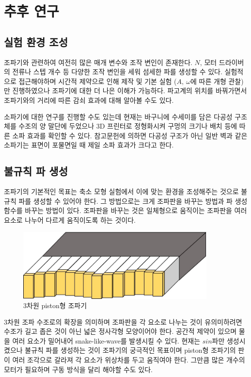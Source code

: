 \section{추후 연구}

\subsection{실험 환경 조성}
조파기와 관련하여 여전히 많은 매개 변수와 조작 변인이 존재한다. $N$, 모터 드라이버의 전류나 스텝 개수 등 다양한 조작 변인을 세워 섬세한 파를 생성할 수 있다. 실험적으로 접근해야하며 시간적 제약으로 인해 제작 및 기본 실험 ($A,~\omega$에 따른 개형 관찰)만 진행하였으나 조파기에 대한 더 나은 이해가 가능하다. 파고계의 위치를 바꿔가면서 조파기와의 거리에 따른 감쇠 효과에 대해 알아볼 수도 있다.

소파기에 대한 연구를 진행할 수도 있는데 현재는 바구니에 수세미를 담은 다공성 구조체를 수조의 양 말단에 두었으나 3D 프린터로 정형화시켜 구멍의 크기나 배치 등에 따른 소파 효과를 확인할 수 있다. 참고문헌에 의하면 다공성 구조가 아닌 일반 벽과 같은 소파기는 표면이 포물면일 때 제일 소파 효과가 크다고 한다.

\subsection{불규칙 파 생성}
조파기의 기본적인 목표는 축소 모형 실험에서 이에 맞는 환경을 조성해주는 것으로 불규칙 파를 생성할 수 있어야 한다. 그 방법으로는 크게 조파판을 바꾸는 방법과 파 생성함수를 바꾸는 방법이 있다. 조파판을 바꾸는 것은 일체형으로 움직이는 조파판을 여러 요소로 나누어 다르게 움직이도록 하는 것이다.

\begin{figure}[htbp]
    \centering
    \includegraphics[width=10cm]{images/Wave_Maker(Snake).jpg}
    \caption{3차원 piston형 조파기}
    \label{Snake Wave Maker}
\end{figure}

3차원 조파 수조로의 확장을 의미하며 조파판을 각 요소로 나누는 것이 유의미하려면 수조가 길고 좁은 것이 아닌 넓은 정사각형 모양이어야 한다. 공간적 제약이 있으며 물을 여러 요소가 밀어내어 snake-like-wave를 발생시킬 수 있다. 현재는 $sin$파만 생성시켰으나 불규칙 파를 생성하는 것이 조파기의 궁극적인 목표이며 piston형 조파기의 판이 여러 조각으로 갈라져 각 요소가 위상차를 두고 움직여야 한다. 그만큼 많은 개수의 모터가 필요하며 구동 방식을 달리 해야할 수도 있다.